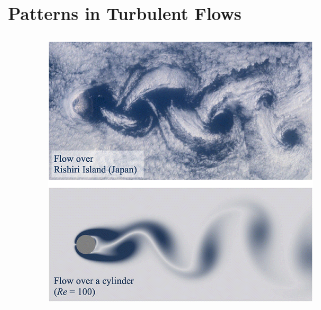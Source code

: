 \documentclass{beamer}
\begin{document}
\begin{frame}
\frametitle{Patterns in Turbulent Flows}
\begin{figure}[h]
\includegraphics[width=7cm]{img/flow_over_rishiri_island.png}
\caption{\tiny{} ~\parencite{taira2020modal}}
\end{figure}
\end{frame}
\end{document}
